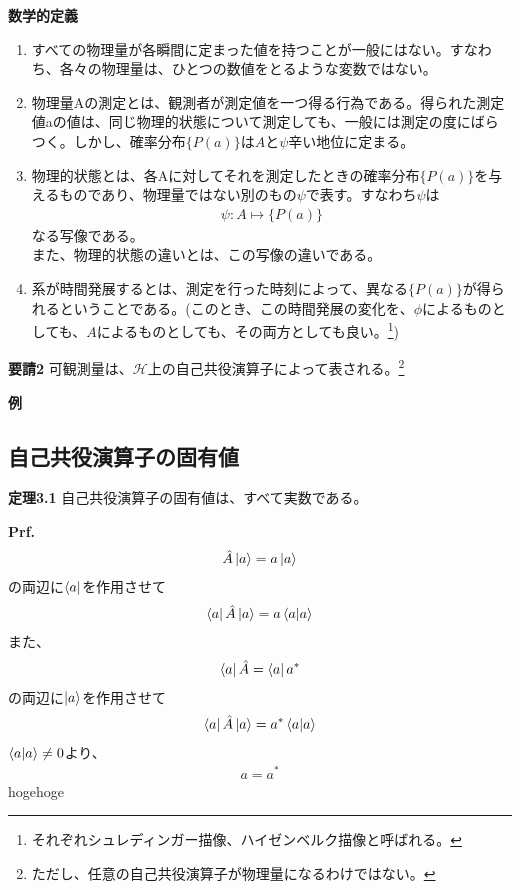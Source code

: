 \documentclass[a4paper,11pt]{jsarticle}
\begin{document}
\begin{itembox}[l]{\textbf{数学的定義}}
  \begin{enumerate}
    \item すべての物理量が各瞬間に定まった値を持つことが一般にはない。すなわち、各々の物理量は、ひとつの数値をとるような変数ではない。
    \item 物理量Aの測定とは、観測者が測定値を一つ得る行為である。得られた測定値aの値は、同じ物理的状態について測定しても、一般には測定の度にばらつく。しかし、確率分布$\{P(a)\}$は$A$と$\psi$辛い地位に定まる。
\item 物理的状態とは、各Aに対してそれを測定したときの確率分布$\{P(a)\}$を与えるものであり、物理量ではない別のもの$\psi$で表す。すなわち$\psi$は
\begin{align}
\psi : A \mapsto \{P(a)\}
\end{align}
なる写像である。\\
また、物理的状態の違いとは、この写像の違いである。
\item 系が時間発展するとは、測定を行った時刻によって、異なる$\{P(a)\}$が得られるということである。(このとき、この時間発展の変化を、$\phi$によるものとしても、$A$によるものとしても、その両方としても良い。\footnote{それぞれシュレディンガー描像、ハイゼンベルク描像と呼ばれる。})
  \end{enumerate}
\end{itembox}

\begin{itembox}[l]{\textbf {要請2}}
可観測量は、$\mathcal H$上の自己共役演算子によって表される。\footnote{ただし、任意の自己共役演算子が物理量になるわけではない。}
\end{itembox}
\textbf{例}

\subsection{自己共役演算子の固有値}
\begin{itembox}[l]{\textbf {定理3.1}}
自己共役演算子の固有値は、すべて実数である。
\end{itembox}
\textbf{Prf.}
\begin{align}
\hat{A}\ket{a} =a\ket{a}
\end{align}
の両辺に$\bra{a}$を作用させて
\begin{align}
\bra{a}\hat{A}\ket{a} =a\braket{a}
\end{align}
また、
\begin{align}
\bra{a}\hat{A} =\bra{a}a^{*}
\end{align}
の両辺に$\ket{a}$を作用させて
\begin{align}
\bra{a}\hat{A}\ket{a} =a^{*}\braket{a}
\end{align}
$\braket{a}{a}\neq 0$より、
\begin{align}
a=a^{*}
\end{align}
hogehoge
\newpage
\end{document}
